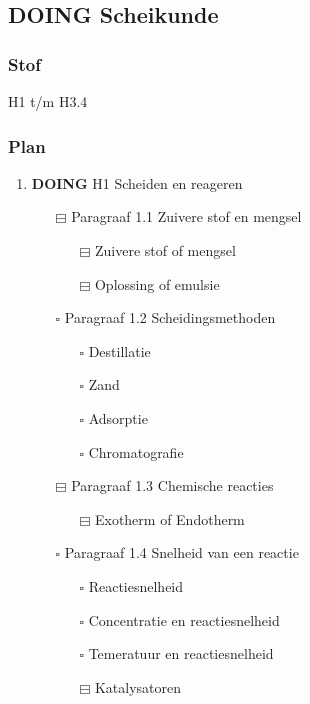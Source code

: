 \documentclass[11pt]{article}
\begin{document}
\subsection{{\bfseries\sffamily DOING} Scheikunde}
\label{sec:orgf175b14}
\subsubsection{Stof}
\label{sec:orgc06c0dd}
H1 t/m H3.4
\subsubsection{Plan}
\label{sec:orgc9e3133}
\begin{enumerate}
\item {\bfseries\sffamily DOING} H1 Scheiden en reageren
\label{sec:org4893c8f}
\begin{itemize}
\item[{$\boxminus$}] Paragraaf 1.1 Zuivere stof en mengsel
\begin{itemize}
\item[{$\boxminus$}] Zuivere stof of mengsel
\item[{$\boxminus$}] Oplossing of emulsie
\end{itemize}
\item[{$\square$}] Paragraaf 1.2 Scheidingsmethoden
\begin{itemize}
\item[{$\square$}] Destillatie
\item[{$\square$}] Zand
\item[{$\square$}] Adsorptie
\item[{$\square$}] Chromatografie
\end{itemize}
\item[{$\boxminus$}] Paragraaf 1.3 Chemische reacties
\begin{itemize}
\item[{$\boxminus$}] Exotherm of Endotherm
\end{itemize}
\item[{$\square$}] Paragraaf 1.4 Snelheid van een reactie
\begin{itemize}
\item[{$\square$}] Reactiesnelheid
\item[{$\square$}] Concentratie en reactiesnelheid
\item[{$\square$}] Temeratuur en reactiesnelheid
\item[{$\boxminus$}] Katalysatoren
\end{itemize}
\end{itemize}

\end{enumerate}
\end{document}
